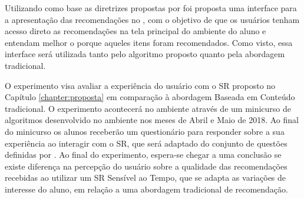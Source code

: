 Utilizando como base as diretrizes propostas por  foi proposta uma interface para a apresentação das recomendações no \adaptweb,
com o objetivo de que os usuários tenham acesso direto as recomendações na tela principal do ambiente do aluno e entendam
melhor o porque aqueles itens foram recomendados. Como visto, essa interface será utilizada tanto pelo algoritmo proposto
quanto pela abordagem tradicional.

O experimento visa avaliar a experiência do usuário com o SR proposto no Capítulo \ref{chapter:proposta} em
comparação à abordagem Baseada em Conteúdo tradicional. O experimento acontecerá no ambiente
\adaptweb através de um minicurso de algoritmos desenvolvido no ambiente nos meses de
Abril e Maio de 2018. Ao final do minicurso os alunos receberão um questionário para responder sobre a sua experiência
ao interagir com o SR, que será adaptado do conjunto de questões definidas por . Ao final do
experimento, espera-se chegar a uma conclusão se existe diferença na percepção do usuário sobre a qualidade
das recomendações recebidas ao utilizar um SR Sensível ao Tempo, que se adapta as variações de interesse do
aluno, em relação a uma abordagem tradicional de recomendação.
